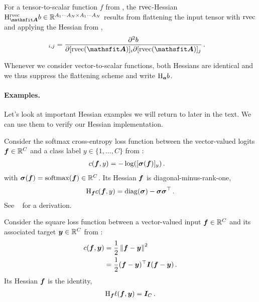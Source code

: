 \begin{definition}\label{def:rvec_hessian}
  For a tensor-to-scalar function $f$ from , the $\operatorname{rvec}$-Hessian $\hess_{\tA}^{\rvec}b \in \sR^{A_1 \cdots A_N \times A_1 \cdots A_N}$ results from flattening the input tensor with $\operatorname{rvec}$ and applying the Hessian from ,
  \begin{align*}
    [\hess^{\rvec}_{\tA}b]_{i, j}
     & =
    \frac{\partial^2 b}{\partial [\rvec(\tA)]_{i} \partial [\rvec(\tA)]_{j}}\,.
  \end{align*}
\end{definition}

Whenever we consider vector-to-scalar functions, both Hessians are identical and we thus suppress the flattening scheme and write $\mathrm{H}_{{\bm{a}}}b$.

\paragraph{Examples.}
Let's look at important Hessian examples we will return to later in the text.
We can use them to verify our Hessian implementation.

\switchcolumn[1]
\switchcolumn[0]

\begin{example}
  Consider the softmax cross-entropy loss function between the vector-valued logits ${\bm{f}} \in {\mathbb{R}}^C$ and a class label $y \in \{1, \dots, C\}$ from :
  \begin{align*}
    c({\bm{f}}, y)
     & =
    -\log([{\bm{\sigma}}({\bm{f}})]_y)\,.
  \end{align*}
  with ${\bm{\sigma}}({\bm{f}}) = \mathrm{softmax}({\bm{f}}) \in {\mathbb{R}}^C$.
  Its Hessian \wrt ${\bm{f}}$ is diagonal-minus-rank-one,
  \begin{align*}
    \mathrm{H}_{{\bm{f}}} c({\bm{f}}, y)
    =
    \operatorname{diag}({\bm{\sigma}}) - {\bm{\sigma}} {\bm{\sigma}}^\top\,.
  \end{align*}
  See \eg~\citet{dangel2020modular} for a derivation.
\end{example}

\switchcolumn[1]

\switchcolumn[0]
\begin{example}\label{ex:square_loss_hessian}
  Consider the square loss function between a vector-valued input ${\bm{f}} \in {\mathbb{R}}^C$ and its associated target ${\bm{y}} \in {\mathbb{R}}^C$ from :
  \begin{align*}
    c({\bm{f}}, {\bm{y}})
     & =
    \frac{1}{2}\left\lVert
    {\bm{f}} - {\bm{y}}
    \right\rVert^2
    \\
     & =
    \frac{1}{2}({\bm{f}} - {\bm{y}})^{\top} {\bm{I}} ({\bm{f}} - {\bm{y}})\,.
  \end{align*}
  Its Hessian \wrt ${\bm{f}}$ is the identity,
  \begin{align*}
    \mathrm{H}_{{\bm{f}}} \ell({\bm{f}}, {\bm{y}})
    =
    {\bm{I}}_C\,.
  \end{align*}
\end{example}

